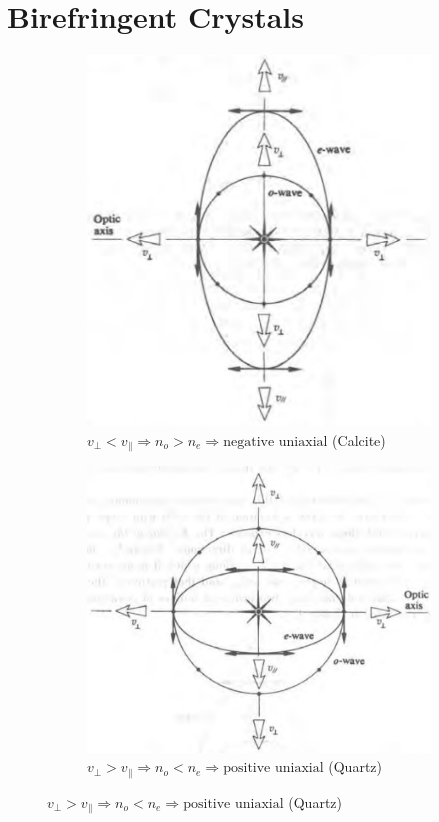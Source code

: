 \section{Birefringent Crystals}

\begin{figure}[H]
  \centering
  \begin{subfigure}{.45\textwidth}
    \centering
    \includegraphics[width=0.7\linewidth]{figures/negative-uniaxial}
    \caption{$v_{\perp} < v_{\parallel} \Rightarrow n_o > n_e \Rightarrow \text{negative uniaxial}$ (Calcite)}
  \end{subfigure}
  \begin{subfigure}{.45\textwidth}
    \centering
    \includegraphics[width=0.7\linewidth]{figures/positive-uniaxial}
    \caption{$v_{\perp} > v_{\parallel} \Rightarrow n_o < n_e \Rightarrow \text{positive uniaxial}$ (Quartz)}
  \end{subfigure}
\end{figure}

